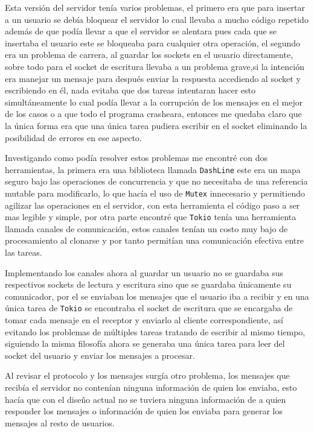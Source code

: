 \documentclass[12pt, titlepage]{article}
\begin{document}
Esta versión del servidor tenía varios problemas, el primero era que para insertar a un usuario se debía bloquear el servidor lo cual llevaba a mucho código repetido además de que podía llevar a que el servidor se alentara pues cada que se insertaba el usuario este se bloqueaba para cualquier otra operación, el segundo era un problema de carrera, al guardar los sockets en el usuario directamente, sobre todo para el socket de escritura llevaba a un problema grave,si la intención era manejar un mensaje para después enviar la respuesta accediendo al socket y escribiendo en él, nada evitaba que dos tareas intentaran hacer esto simultáneamente lo cual podía llevar a la corrupción de los mensajes en el mejor de los casos o a que todo el programa crasheara, entonces me quedaba claro que la única forma era que una única tarea pudiera escribir en el socket eliminando la posibilidad de errores en ese aspecto.

Investigando como podía resolver estos problemas me encontré con dos herramientas, la primera era una biblioteca llamada \lstinline|DashLine| este era un mapa seguro bajo las operaciones de concurrencia y que no necesitaba de una referencia mutable para modificarlo, lo que hacía el uso de \lstinline|Mutex| innecesario y permitiendo agilizar las operaciones en el servidor, con esta herramienta el código paso a ser mas legible y simple, por otra parte encontré que \lstinline|Tokio| tenía una herramienta llamada canales de comunicación, estos canales tenían un costo muy bajo de procesamiento al clonarse y por tanto permitían una comunicación efectiva entre las tareas.

Implementando los canales ahora al guardar un usuario no se guardaba sus respectivos sockets de lectura y escritura sino que se guardaba únicamente su comunicador, por el se enviaban los mensajes que el usuario iba a recibir y en una única tarea de \lstinline|Tokio| se encontraba el socket de escritura que se encargaba de tomar cada mensaje en el receptor y enviarlo al cliente correspondiente, así evitando los problemas de múltiples tareas tratando de escribir al mismo tiempo, siguiendo la misma filosofía ahora se generaba una única tarea para leer del socket del usuario y enviar los mensajes a procesar.

Al revisar el protocolo y los mensajes surgía otro problema, los mensajes que recibía el servidor no contenían ninguna información de quien los enviaba, esto hacía que con el diseño actual no se tuviera ninguna información de a quien responder los mensajes o información de quien los enviaba para generar los mensajes al resto de usuarios.
\end{document}
